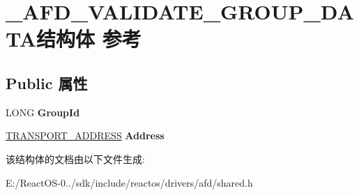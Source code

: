 \hypertarget{struct___a_f_d___v_a_l_i_d_a_t_e___g_r_o_u_p___d_a_t_a}{}\section{\+\_\+\+A\+F\+D\+\_\+\+V\+A\+L\+I\+D\+A\+T\+E\+\_\+\+G\+R\+O\+U\+P\+\_\+\+D\+A\+T\+A结构体 参考}
\label{struct___a_f_d___v_a_l_i_d_a_t_e___g_r_o_u_p___d_a_t_a}
\subsection*{Public 属性}
\begin{DoxyCompactItemize}
\item 
\mbox{\label{struct___a_f_d___v_a_l_i_d_a_t_e___g_r_o_u_p___d_a_t_a_a771632faf6feef6f777e19a13c9e80bb}} 
L\+O\+NG {\bfseries Group\+Id}
\item 
\mbox{\label{struct___a_f_d___v_a_l_i_d_a_t_e___g_r_o_u_p___d_a_t_a_a5a003d14c9ed21f2798e37ea191b7bda}} 
\hyperlink{struct___t_r_a_n_s_p_o_r_t___a_d_d_r_e_s_s}{T\+R\+A\+N\+S\+P\+O\+R\+T\+\_\+\+A\+D\+D\+R\+E\+SS} {\bfseries Address}
\end{DoxyCompactItemize}


该结构体的文档由以下文件生成\+:\begin{DoxyCompactItemize}
\item 
E\+:/\+React\+O\+S-\/0../sdk/include/reactos/drivers/afd/shared.\+h\end{DoxyCompactItemize}
